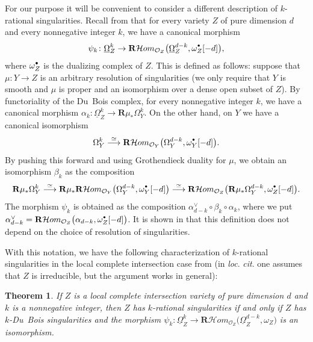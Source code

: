 \documentclass[11pt]{article}
\numberwithin{equation}{section}
\newcommand{\sbullet}{{\scriptscriptstyle\bullet}}
\newcommand{\csbullet}{{\raisebox{1pt}{$\sbullet$}}}
\theoremstyle{plain}
\newtheorem{thm}{Theorem}[section]
\theoremstyle{definition}
\newcommand\R{{\mathbf R}}
\newcommand\cH{\mathcal{H}}
\newcommand\cO{\mathcal{O}}
\newcommand\cH{\mathcal{H}}
\newcommand\cO{\mathcal{O}}
\begin{document}
For our purpose it will be convenient to consider a different description of $k$-rational singularities. Recall from
\cite[\S 6]{MP2} that for every variety $Z$ of pure dimension $d$ and every nonnegative integer $k$, we have a canonical morphism\vspace*{-3pt}
\begin{equation}\label{eq_can1}
\psi_k\colon \underline{\Omega}_Z^k\to \R\cH om_{\cO_Z}\big(\underline{\Omega}_Z^{d-k},\omega_Z^{\csbullet}[-d]\big),
\end{equation}
where $\omega_Z^{\csbullet}$ is the dualizing complex of $Z$. This is defined as follows: suppose that $\mu\colon Y\to Z$
is an arbitrary resolution of singularities (we only require that $Y$ is smooth and $\mu$ is proper and an isomorphism
over a dense open subset of $Z$). By functoriality of the Du~Bois complex, for every nonnegative integer $k$, we have a canonical morphism
$\alpha_k\colon\underline{\Omega}_Z^k\to \R\mu_*\Omega_Y^k$. On the other hand, on $Y$ we have a canonical isomorphism\vspace*{-3pt}
\[\Omega_Y^k\overset{\simeq}\longrightarrow \R\cH om_{\cO_Y}\big(\Omega_Y^{d-k},\omega_Y^{\csbullet}[-d]\big).\]
By pushing this forward and using Grothendieck duality for $\mu$, we obtain an isomorphism $\beta_k$ as the composition\vspace*{-3pt}
\[\R\mu_*\Omega_Y^k\overset{\simeq}\longrightarrow \R\mu_*\R\cH om_{\cO_Y}\big(\Omega_Y^{d-k},\omega_Y^{\csbullet}[-d]\big)\overset{\simeq}\longrightarrow
\R\cH om_{\cO_Z}\big(\R\mu_*\Omega_Y^{d-k},\omega_Z^{\csbullet}[-d]\big).\]
The morphism $\psi_k$ is obtained as the composition $\alpha_{d-k}^{\vee}\circ \beta_k\circ\alpha_k$, where we put
$\alpha_{d-k}^{\vee}=\R\cH om_{\cO_Z}\big(\alpha_{d-k},\omega_Z^{\csbullet}[-d]\big)$.
It is shown in \cite[Prop.\,6.1]{MP2} that this definition does not depend on the choice of resolution of singularities.

With this notation, we have the following characterization of $k$-rational singularities in the local complete intersection case
from \cite{MP2} (in \emph{loc}. \emph{cit}. one assumes that $Z$ is irreducible, but the argument works in general):

\begin{thm}\label{chr_k_rat}
If $Z$ is a local complete intersection variety of pure dimension $d$ and $k$ is a nonnegative integer, then $Z$ has $k$-rational singularities
if and only if $Z$ has $k$-Du~Bois singularities and the morphism $\psi_k\colon \underline{\Omega}_Z^k\to \R\cH om_{\cO_Z}\big(\underline{\Omega}_Z^{d-k},\omega_Z\big)$ is an isomorphism.
\end{thm}
\end{document}
